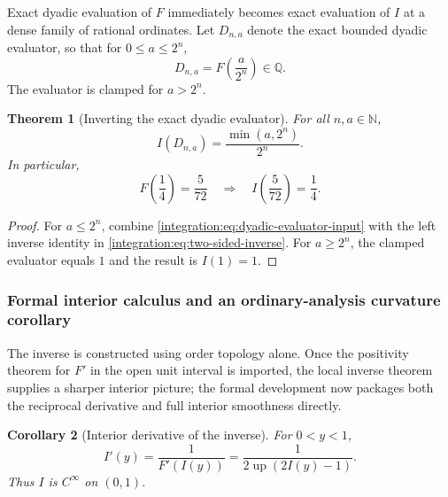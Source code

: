 \documentclass[11pt,oneside]{article}
\newtheorem{theorem}{Theorem}[section]
\newtheorem{corollary}[theorem]{Corollary}
\theoremstyle{definition}
\theoremstyle{remark}
\newcommand{\Q}{\mathbb Q}
\newcommand{\N}{\mathbb N}
\newcommand{\Up}{\operatorname{up}}
\begin{document}
Exact dyadic evaluation of $F$ immediately becomes exact evaluation of $I$ at a dense family
of rational ordinates.  Let $D_{n,a}$ denote the exact bounded dyadic evaluator, so that for
$0\le a\le2^n$,
\begin{equation}
 D_{n,a}=F\!\left(\frac{a}{2^n}\right)\in\Q.
 \label{integration:eq:dyadic-evaluator-input}
\end{equation}
The evaluator is clamped for $a>2^n$.

\begin{theorem}[Inverting the exact dyadic evaluator]
\label{integration:thm:inverse-dyadic-evaluator}
For all $n,a\in\N$,
\begin{equation}
 I(D_{n,a})=\frac{\min(a,2^n)}{2^n}.
 \label{integration:eq:inverse-dyadic-evaluator}
\end{equation}
In particular,
\begin{equation}
 F\!\left(\frac14\right)=\frac5{72}
 \quad\Longrightarrow\quad
 I\!\left(\frac5{72}\right)=\frac14.
 \label{integration:eq:inverse-five-seventy-two}
\end{equation}
\end{theorem}

\begin{proof}
For $a\le2^n$, combine \eqref{integration:eq:dyadic-evaluator-input} with the left inverse identity in
\eqref{integration:eq:two-sided-inverse}.  For $a\ge2^n$, the clamped evaluator equals $1$ and the result
is $I(1)=1$.
\end{proof}

\subsubsection{Formal interior calculus and an ordinary-analysis curvature corollary}

The inverse is constructed using order topology alone.  Once the positivity theorem for
$F'$ in the open unit interval is imported, the local inverse theorem supplies a sharper
interior picture; the formal development now packages both the reciprocal derivative and
full interior smoothness directly.

\begin{corollary}[Interior derivative of the inverse]
\label{integration:cor:inverse-derivative}
For $0<y<1$,
\begin{equation}
 I'(y)=\frac{1}{F'(I(y))}
      =\frac{1}{2\Up(2I(y)-1)}.
 \label{integration:eq:inverse-derivative}
\end{equation}
Thus $I$ is $C^\infty$ on $(0,1)$.
\end{corollary}
\end{document}

